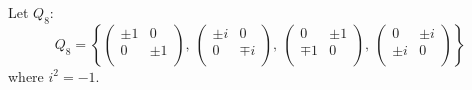 \documentclass[../main.tex]{subfiles}
\begin{document}
\begin{example}
  Let $Q_8$:
  \[
    Q_8 = \left\{\begin{pmatrix}
    \pm 1 & 0 \\
    0 & \pm 1 \\
    \end{pmatrix},\
    \begin{pmatrix}
    \pm i & 0 \\
    0 & \mp i \\
    \end{pmatrix},\
    \begin{pmatrix}
    0 & \pm1 \\
    \mp 1 & 0 \\
    \end{pmatrix},\
    \begin{pmatrix}
    0 & \pm i \\
    \pm i & 0 \\
    \end{pmatrix}\right\}
  \]
  where $i^2 = -1$.


\end{example}
\end{document}
